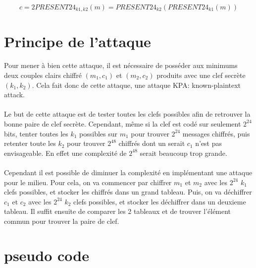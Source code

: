 \documentclass{report}
\begin{document}
\[ c  = 2PRESENT24 _{ k1,k2 }  (m) = PRESENT24_{ k2 }( PRESENT24_{ k1 }(m)) \] 

\section{ Principe de l'attaque  } 
\paragraph{} Pour mener à bien cette attaque, il est nécessaire de posséder aux minimums deux couples clairs chiffré 
$(m_{1},c_{1} )$ et $(m_{2},c_{2} )$ produits avec une clef secrète $(k_{1},k_{2})$. 
Cela fait donc de cette attaque, une attaque KPA: known-plaintext attack.

\paragraph{} Le but de cette attaque est de tester toutes les clefs possibles afin de retrouver la bonne paire de clef secrète.
Cependant, même si la clef est codé sur seulement $2^{24}$ bits, tenter toutes les $k_{1}$ possibles sur $m_{1}$ pour trouver $2^{24}$ messages chiffrés, 
puis retenter toute les $k_{2}$ pour trouver $2^{48}$ chiffrés dont un serait $c_{1}$ n'est pas envisageable. 
En effet une complexité de $2^{48}$ serait beaucoup trop grande.
 
\paragraph{} Cependant il est possible de diminuer la complexité en implémentant une attaque pour le milieu. 
Pour cela, on va commencer par chiffrer $m_{1}$ et $m_{2}$ avec les  $2^{24}$ $k_{1}$ clefs possibles, et stocker les chiffrés dans un grand tableau.
Puis, on va déchiffrer $c_{1}$ et $c_{2}$ avec les  $2^{24}$ $k_{2}$ clefs possibles, et stocker les déchiffrer  dans un deuxieme tableau.
Il suffit ensuite de comparer les 2 tableaux et de trouver l'élément commun pour trouver la paire de clef.

\newpage
\section{ pseudo code } 
\end{document}
